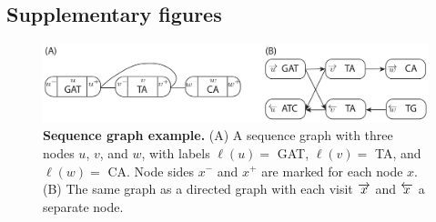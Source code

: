\documentclass[11pt]{ucscthesis}
\newcommand{\nodelabel}[1]{\ensuremath{\ell\left( #1 \right)}}
\newcommand{\leftside}[1]{\ensuremath{{ #1 }^{-}}}
\newcommand{\rightside}[1]{\ensuremath{{ #1 }^{+}}}
\newcommand{\forwardnode}[1]{\ensuremath{\protect\overrightarrow{ #1 }}}
\newcommand{\reversenode}[1]{\ensuremath{\protect\overleftarrow{ #1 }}}
\begin{document}
\newpage

\subsection{Supplementary figures}

\begin{figure}[H]
    \centering
    \includegraphics[width=\linewidth]{aim2_supplement_graph_example.pdf}
    \caption[Sequence graph example]{\textbf{Sequence graph example.}
      (A) A sequence graph with three nodes $u$, $v$, and $w$, with labels $\nodelabel{u} =$ GAT, $\nodelabel{v} =$ TA, and $\nodelabel{w} =$ CA. Node sides $\leftside{x}$ and $\rightside{x}$ are marked for each node $x$.
      (B) The same graph as a directed graph with each visit $\forwardnode{x}$ and $\reversenode{x}$ a separate node.
    }
    \label{fig:aim2_supplement_graph-example}
    \label{fig:first}
\end{figure}
\end{document}
